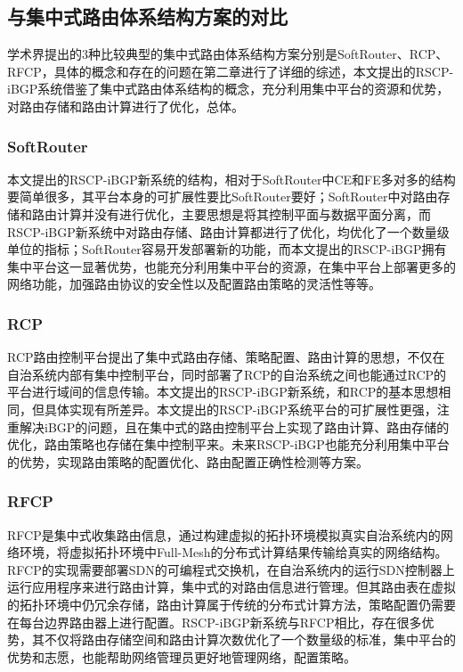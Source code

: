 \subsection{与集中式路由体系结构方案的对比}


学术界提出的3种比较典型的集中式路由体系结构方案分别是SoftRouter、RCP、RFCP，具体的概念和存在的问题在第二章进行了详细的综述，本文提出的RSCP-iBGP系统借鉴了集中式路由体系结构的概念，充分利用集中平台的资源和优势，对路由存储和路由计算进行了优化，总体。

\subsubsection{SoftRouter}

本文提出的RSCP-iBGP新系统的结构，相对于SoftRouter中CE和FE多对多的结构要简单很多，其平台本身的可扩展性要比SoftRouter要好；SoftRouter中对路由存储和路由计算并没有进行优化，主要思想是将其控制平面与数据平面分离，而RSCP-iBGP新系统中对路由存储、路由计算都进行了优化，均优化了一个数量级单位的指标；SoftRouter容易开发部署新的功能，而本文提出的RSCP-iBGP拥有集中平台这一显著优势，也能充分利用集中平台的资源，在集中平台上部署更多的网络功能，加强路由协议的安全性以及配置路由策略的灵活性等等。

\subsubsection{RCP}
RCP路由控制平台提出了集中式路由存储、策略配置、路由计算的思想，不仅在自治系统内部有集中控制平台，同时部署了RCP的自治系统之间也能通过RCP的平台进行域间的信息传输。本文提出的RSCP-iBGP新系统，和RCP的基本思想相同，但具体实现有所差异。本文提出的RSCP-iBGP系统平台的可扩展性更强，注重解决iBGP的问题，且在集中式的路由控制平台上实现了路由计算、路由存储的优化，路由策略也存储在集中控制平来。未来RSCP-iBGP也能充分利用集中平台的优势，实现路由策略的配置优化、路由配置正确性检测等方案。


\subsubsection{RFCP}

RFCP是集中式收集路由信息，通过构建虚拟的拓扑环境模拟真实自治系统内的网络环境，将虚拟拓扑环境中Full-Mesh的分布式计算结果传输给真实的网络结构。RFCP的实现需要部署SDN的可编程式交换机，在自治系统内的运行SDN控制器上运行应用程序来进行路由计算，集中式的对路由信息进行管理。但其路由表在虚拟的拓扑环境中仍冗余存储，路由计算属于传统的分布式计算方法，策略配置仍需要在每台边界路由器上进行配置。RSCP-iBGP新系统与RFCP相比，存在很多优势，其不仅将路由存储空间和路由计算次数优化了一个数量级的标准，集中平台的优势和志愿，也能帮助网络管理员更好地管理网络，配置策略。


